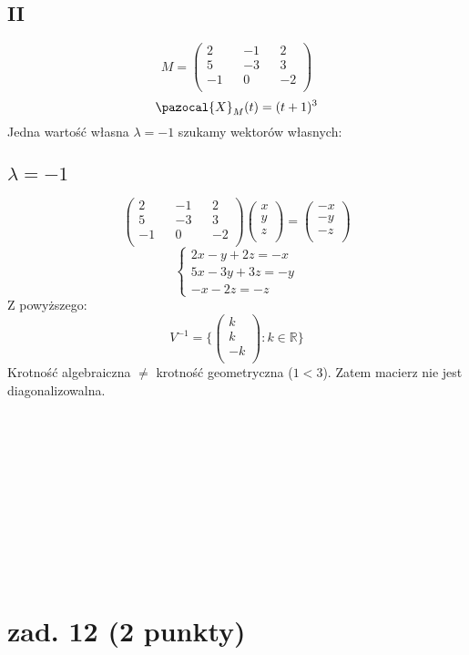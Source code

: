 \documentclass{article}
\begin{document}
\subsection*{II}
$$M =
\begin{pmatrix}
2 && -1 && 2\\
5 && -3 && 3\\
-1 && 0 && -2\\
\end{pmatrix}
$$
$$
\pazocal{X}_M(t) = (t+1)^3
$$
Jedna wartość własna $\lambda = -1$ szukamy wektorów własnych:
\subsection*{$\lambda = -1$}
$$
\begin{pmatrix}
2 && -1 && 2\\
5 && -3 && 3\\
-1 && 0 && -2\\
\end{pmatrix}
\begin{pmatrix}
x\\
y\\
z\\
\end{pmatrix} =
\begin{pmatrix}
-x\\
-y\\
-z\\
\end{pmatrix}
$$
$$
\begin{cases}
2x - y + 2z = -x\\
5x -3y + 3z = -y\\
-x -2z = -z
\end{cases}
$$
Z powyższego:
$$
V^{-1} = \{\begin{pmatrix}
k\\
k\\
-k\\
\end{pmatrix} : k \in \mathbb{R}\}
$$
Krotność algebraiczna $\neq$ krotność geometryczna ($1 < 3$). Zatem macierz nie jest diagonalizowalna.\\\\\\\\\\\\\\\\\\\\\
\section{zad. 12 (2 punkty)}
\end{document}
